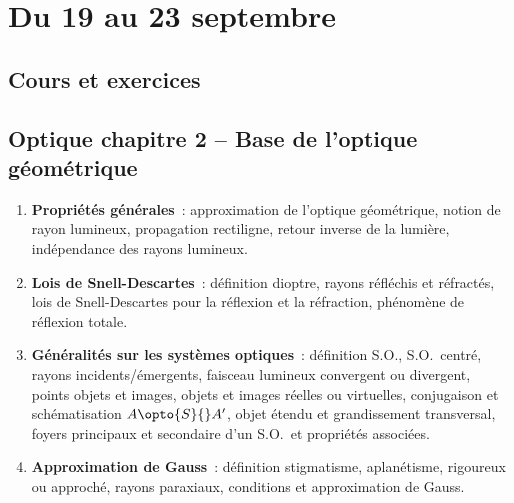 \documentclass[a4paper, 12pt, final, garamond]{book}
\begin{document}
\setcounter{chapter}{1}

\chapter{Du 19 au 23 septembre}

\section{Cours et exercices}

\section*{Optique chapitre 2 -- Base de l'optique géométrique}
\begin{enumerate}[label=\Roman*]
    \item \textbf{Propriétés générales}~: approximation de l'optique
        géométrique, notion de rayon lumineux, propagation rectiligne, retour
        inverse de la lumière, indépendance des rayons lumineux.
    \item \textbf{Lois de Snell-Descartes}~: définition dioptre, rayons
        réfléchis et réfractés, lois de Snell-Descartes pour la réflexion et la
        réfraction, phénomène de réflexion totale.
    \item \textbf{Généralités sur les systèmes optiques}~: définition S.O.,
        S.O.\ centré, rayons incidents/émergents, faisceau lumineux convergent
        ou divergent, points objets et images, objets et images réelles ou
        virtuelles, conjugaison et schématisation $A \opto{S}{}A'$, objet étendu
        et grandissement transversal, foyers principaux et secondaire d'un S.O.\
        et propriétés associées.
    \item \textbf{Approximation de Gauss}~: définition stigmatisme, aplanétisme,
        rigoureux ou approché, rayons paraxiaux, conditions et approximation de
        Gauss.
\end{enumerate}
\end{document}
